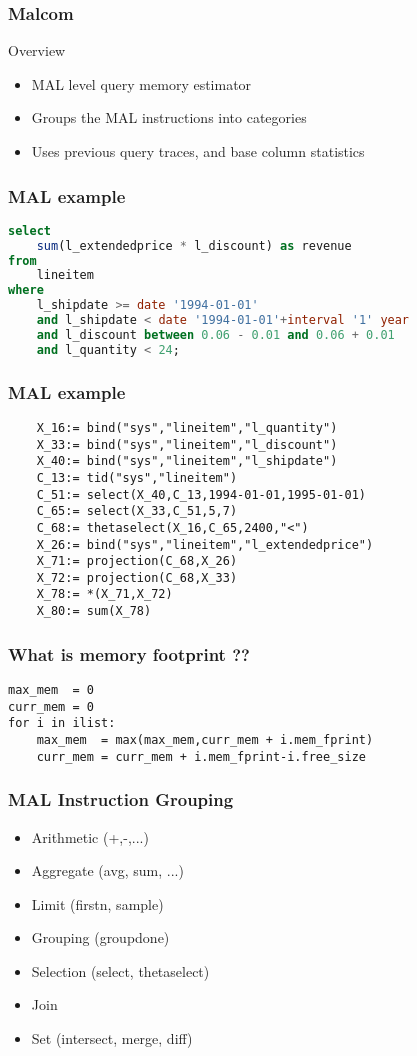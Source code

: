 \begin{frame}
\frametitle{Malcom}
\begin{block}{Overview}
\begin{itemize}
	\item MAL level query memory estimator
	\item Groups the MAL instructions into categories
	\item Uses previous query traces, and base column statistics
\end{itemize}
\end{block}
\end{frame}

\begin{frame}[fragile]
\frametitle{MAL example}
	\begin{lstlisting}[basicstyle=\ttfamily\footnotesize, language=SQL]
select
	sum(l_extendedprice * l_discount) as revenue
from
	lineitem
where
	l_shipdate >= date '1994-01-01'
	and l_shipdate < date '1994-01-01'+interval '1' year
	and l_discount between 0.06 - 0.01 and 0.06 + 0.01
	and l_quantity < 24;
	\end{lstlisting}
\end{frame}

\begin{frame}[fragile]
\frametitle{MAL example}
	\begin{lstlisting}
	X_16:= bind("sys","lineitem","l_quantity")
	X_33:= bind("sys","lineitem","l_discount")
	X_40:= bind("sys","lineitem","l_shipdate")
	C_13:= tid("sys","lineitem")
	C_51:= select(X_40,C_13,1994-01-01,1995-01-01)
	C_65:= select(X_33,C_51,5,7)
	C_68:= thetaselect(X_16,C_65,2400,"<")
	X_26:= bind("sys","lineitem","l_extendedprice")
	X_71:= projection(C_68,X_26)
	X_72:= projection(C_68,X_33)
	X_78:= *(X_71,X_72)
	X_80:= sum(X_78)
	\end{lstlisting}
\end{frame}

\begin{frame}[fragile]
\frametitle{What is memory footprint ??}
\begin{lstlisting}
max_mem  = 0
curr_mem = 0
for i in ilist:
	max_mem  = max(max_mem,curr_mem + i.mem_fprint)
	curr_mem = curr_mem + i.mem_fprint-i.free_size
\end{lstlisting}
\end{frame}

\begin{frame}[fragile]
\frametitle{MAL Instruction Grouping}
\begin{itemize}
\item Arithmetic (+,-,...)
\item Aggregate (avg, sum, ...)
\item Limit (firstn, sample)
\item Grouping (groupdone)
\item Selection (select, thetaselect)
\item Join
\item Set (intersect, merge, diff)
\end{itemize}
\end{frame}

